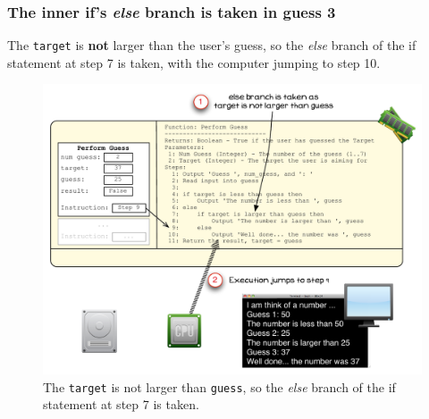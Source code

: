 
\clearpage

\subsubsection{The inner if's \emph{else} branch is taken in guess 3} %
\label{ssub:the_inner_if_s_else_branch_is_taken_in_guess_3}

The \texttt{target} is \textbf{not} larger than the user's guess, so the \emph{else} branch of the if statement at step 7 is taken, with the computer jumping to step 10.

\begin{figure}[htbp]
   \centering
   \includegraphics[width=\textwidth]{./topics/control-flow/images/PerformGuess11} 
   \caption{The \texttt{target} is not larger than \texttt{guess}, so the \emph{else} branch of the if statement at step 7 is taken.}
   \label{fig:perform-guess-11}
\end{figure}

